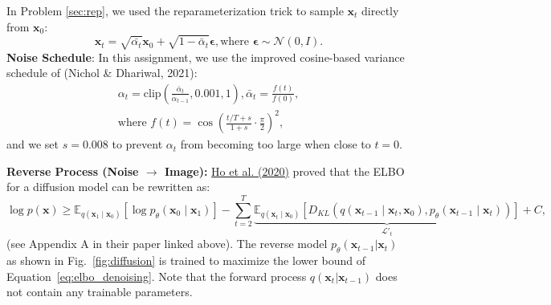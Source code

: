 \documentclass[11pt,addpoints,answers]{exam}
\newcommand{\xv}{\mathbf{x}}
\newcommand{\epsilonv   }{\boldsymbol \epsilon   }
\begin{document}
\begin{questions}
    In Problem \ref{sec:rep}, we used the reparameterization trick to sample \( \xv_t \) directly from \(\xv_0 \):
    \begin{equation}
        \xv_t = \sqrt{\bar{\alpha_t}}\xv_0 + \sqrt{1 - \bar\alpha_t} \epsilonv, \text{where } \epsilonv \sim \mathcal{N}(0,I).
        \label{eq:xt}
    \end{equation}
    \textbf{Noise Schedule}: In this assignment, we use the improved cosine-based variance schedule of (Nichol \& Dhariwal, 2021):
    \begin{equation}
        \begin{aligned}
            \alpha_t = \text{clip}\left(\frac{\bar{\alpha}_t}{\bar\alpha_{t-1}}, 0.001, 1\right), \bar{\alpha}_t = \frac{f(t)}{f(0)}, \\
            \text{where } f(t) = \cos\left(\frac{t/T + s}{1 + s} \cdot \frac{\pi}{2}\right)^2,
        \end{aligned}
    \end{equation}
    and we set $s=0.008$ to prevent $\alpha_t$ from becoming too large when close to $t = 0$.
    
    \textbf{Reverse Process (Noise $\rightarrow$ Image):} \href{https://arxiv.org/pdf/2006.11239.pdf}{Ho et al. (2020)} proved that the ELBO for a diffusion model can be rewritten as:
    \begin{equation}
        \log p(\xv) \ge \mathbb{E}_{q(\xv_1 \mid \xv_0)}[\log p_\theta (\xv_0 \mid \xv_1) ] - \sum_{t=2}^{T} \underbrace{\mathbb{E}_{q( \xv_t \mid \xv_0)}\left[D_{KL} \left(q(\xv_{t-1} \mid \xv_{t}, \xv_{0}), p_\theta(\xv_{t-1} \mid \xv_{t})\right)\right]}_{\mathcal{L'}_t}+ C,
        \label{eq:elbo_denoising}
    \end{equation}
    (see Appendix A in their paper linked above). The reverse model $p_\theta(\xv_{t-1}|\xv_t)$ as shown in Fig.~\ref{fig:diffusion} is trained to maximize the lower bound of Equation~\ref{eq:elbo_denoising}.
    Note that the forward process $q(\xv_t | \xv_{t-1})$  does not contain any trainable parameters.
    

\end{questions}
\end{document}
